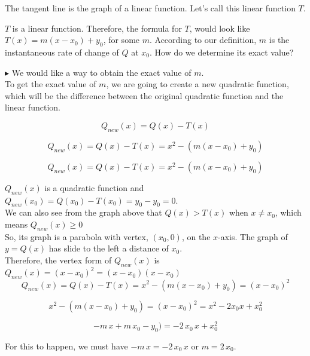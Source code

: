 \documentclass{ximera}
\begin{document}
The tangent line is the graph of a linear function. Let's call this linear function $T$.


$T$ is a linear function. Therefore, the formula for $T$, would look like $T(x) = m(x - x_0) + y_0$, for some $m$.  According to our definition, $m$ is the instantaneous rate of change of $Q$ at $x_0$.  How do we determine its exact value?


$\blacktriangleright$ We would like a way to obtain the exact value of $m$. \\



To get the exact value of $m$, we are going to create a new quadratic function, which will be the difference between the original quadratic function and the linear function.



\begin{explanation}


\[
Q_{new}(x) = Q(x) - T(x) 
\]

\[
Q_{new}(x) = Q(x) - T(x) = x^2 - (m(x - x_0) + y_0)
\]

\[
Q_{new}(x) = Q(x) - T(x) = x^2 - (m(x - x_0) + y_0)
\]


$Q_{new}(x)$ is a quadratic function and $Q_{new}(x_0) = Q(x_0) - T(x_0) = y_0 - y_0 = 0$. \\

We can also see from the graph above that $Q(x) > T(x)$ when $x \ne x_0$, which means $Q_{new}(x) \geq 0$\\


So, its graph is a parabola with vertex, $(x_0, 0)$, on the $x$-axis.  The graph of $y = Q(x)$ has slide to the left a distance of $x_0$.  \\


Therefore, the vertex form of $Q_{new}(x)$ is $Q_{new}(x) = (x - x_0)^2 = (x - x_0)(x - x_0)$  \\






\[
Q_{new}(x) = Q(x) - T(x) = x^2 - (m(x - x_0) + y_0) = (x - x_0)^2
\]




\[
x^2 - (m(x - x_0) + y_0) = (x - x_0)^2 = x^2 - 2 x_0 x + x_0^2
\]



\[
 -m \, x + m \, x_0 - y_0) =   - 2 \, x_0 \, x + x_0^2
\]


For this to happen, we must have $-m \, x = - 2 \, x_0 \, x$ or \textbf{$m = 2 \, x_0$}. \\


\end{explanation}
\end{document}
